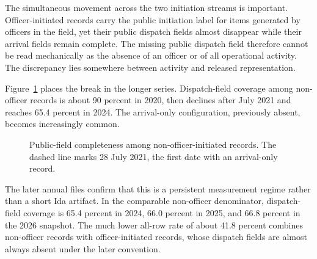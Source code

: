 \documentclass[11pt]{article}
\begin{document}
The simultaneous movement across the two initiation streams is important. Officer-initiated records carry the public initiation label for items generated by officers in the field, yet their public dispatch fields almost disappear while their arrival fields remain complete. The missing public dispatch field therefore cannot be read mechanically as the absence of an officer or of all operational activity. The discrepancy lies somewhere between activity and released representation.

Figure~\ref{fig:monthly} places the break in the longer series. Dispatch-field coverage among non-officer records is about 90 percent in 2020, then declines after July 2021 and reaches 65.4 percent in 2024. The arrival-only configuration, previously absent, becomes increasingly common.

\begin{figure}[!htbp]
\centering
{}
\caption{Public-field completeness among non-officer-initiated records. The dashed line marks 28 July 2021, the first date with an arrival-only record.}
\label{fig:monthly}
\end{figure}

The later annual files confirm that this is a persistent measurement regime rather than a short Ida artifact. In the comparable non-officer denominator, dispatch-field coverage is 65.4 percent in 2024, 66.0 percent in 2025, and 66.8 percent in the 2026 snapshot. The much lower all-row rate of about 41.8 percent combines non-officer records with officer-initiated records, whose dispatch fields are almost always absent under the later convention.
\end{document}
